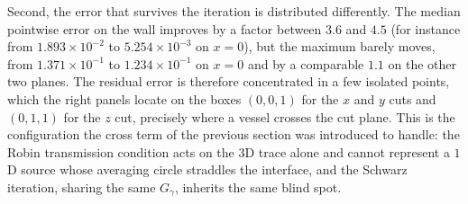 Second, the error that survives the iteration is distributed differently. The median pointwise error on the wall improves by a factor between $3.6$ and $4.5$ (for instance from $1.893\times10^{-2}$ to $5.254\times10^{-3}$ on $x=0$), but the maximum barely moves, from $1.371\times10^{-1}$ to $1.234\times10^{-1}$ on $x=0$ and by a comparable $1.1$ on the other two planes. The residual error is therefore concentrated in a few isolated points, which the right panels locate on the boxes $(0,0,1)$ for the $x$ and $y$ cuts and $(0,1,1)$ for the $z$ cut, precisely where a vessel crosses the cut plane. This is the configuration the cross term of the previous section was introduced to handle: the Robin transmission condition acts on the $3$D trace alone and cannot represent a $1$D source whose averaging circle straddles the interface, and the Schwarz iteration, sharing the same $G_\gamma$, inherits the same blind spot.
